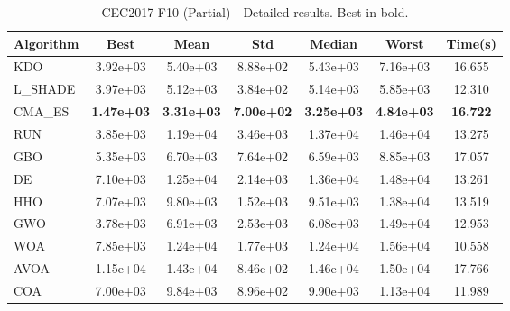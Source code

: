 \begin{table}[H]
\centering\small
\caption{CEC2017 F10 (Partial) - Detailed results. Best in bold.}
\label{tab:cec2017_F10}
\begin{tabular}{lcccccc}
\toprule
\textbf{Algorithm} & \textbf{Best} & \textbf{Mean} & \textbf{Std} & \textbf{Median} & \textbf{Worst} & \textbf{Time(s)} \\
\midrule
KDO & 3.92e+03 & 5.40e+03 & 8.88e+02 & 5.43e+03 & 7.16e+03 & 16.655 \\
L_SHADE & 3.97e+03 & 5.12e+03 & 3.84e+02 & 5.14e+03 & 5.85e+03 & 12.310 \\
CMA_ES & \textbf{1.47e+03} & \textbf{3.31e+03} & \textbf{7.00e+02} & \textbf{3.25e+03} & \textbf{4.84e+03} & \textbf{16.722} \\
RUN & 3.85e+03 & 1.19e+04 & 3.46e+03 & 1.37e+04 & 1.46e+04 & 13.275 \\
GBO & 5.35e+03 & 6.70e+03 & 7.64e+02 & 6.59e+03 & 8.85e+03 & 17.057 \\
DE & 7.10e+03 & 1.25e+04 & 2.14e+03 & 1.36e+04 & 1.48e+04 & 13.261 \\
HHO & 7.07e+03 & 9.80e+03 & 1.52e+03 & 9.51e+03 & 1.38e+04 & 13.519 \\
GWO & 3.78e+03 & 6.91e+03 & 2.53e+03 & 6.08e+03 & 1.49e+04 & 12.953 \\
WOA & 7.85e+03 & 1.24e+04 & 1.77e+03 & 1.24e+04 & 1.56e+04 & 10.558 \\
AVOA & 1.15e+04 & 1.43e+04 & 8.46e+02 & 1.46e+04 & 1.50e+04 & 17.766 \\
COA & 7.00e+03 & 9.84e+03 & 8.96e+02 & 9.90e+03 & 1.13e+04 & 11.989 \\
\bottomrule
\end{tabular}
\end{table}
